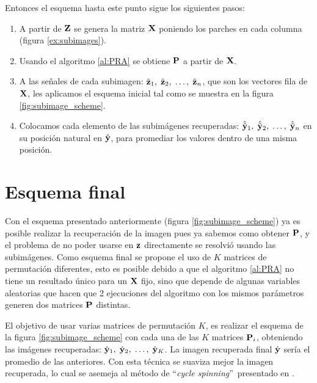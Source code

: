 Entonces el esquema hasta este punto sigue los siguientes pasos:

\begin{enumerate}
	\item A partir de $\Z$ se genera la matriz $\X$ poniendo los parches en cada columna (figura \ref{ex:subimages}).
	\item Usando el algoritmo \ref{al:PRA} se obtiene $\P$ a partir de $\X$.
	\item A las señales de cada subimagen: $\ztilde_1,\; \ztilde_2,\; \dots,\; \ztilde_n$, que son los vectores fila de $\X$, les aplicamos el esquema inicial tal como se muestra en la figura \ref{fig:subimage_scheme}.
	\item Colocamos cada elemento de las subim\'agenes recuperadas: $\yhattilde_1,\; \yhattilde_2,\; \dots,\; \yhattilde_n$ en su posici\'on natural en $\yhat$, para promediar los valores dentro de una misma posici\'on.
\end{enumerate}

\section{Esquema final}

Con el esquema presentado anteriormente (figura \ref{fig:subimage_scheme}) ya es posible realizar la recuperaci\'on de la imagen pues ya sabemos como obtener $\P$, y el problema de no poder usarse en $\z$ directamente se resolvi\'o usando las subim\'agenes. Como esquema final se propone el uso de $K$ matrices de permutaci\'on diferentes, esto es posible debido a que el algoritmo \ref{al:PRA} no tiene un resultado \'unico para un $\X$ fijo, sino que depende de algunas variables aleatorias que hacen que 2 ejecuciones del algoritmo con los mismos par\'ametros generen dos matrices $\P$ distintas.

El objetivo de usar varias matrices de permutaci\'on $K$, es realizar el esquema de la figura \ref{fig:subimage_scheme} con cada una de las $K$ matrices $\P_i$, obteniendo las im\'agenes recuperadas: $\yhat_1,\; \yhat_2,\; \dots,\; \yhat_K$. La imagen recuperada final $\yhat$ ser\'ia el promedio de las anteriores. Con esta t\'ecnica se suaviza mejor la imagen recuperada, lo cual se asemeja al método de \textquotedblleft\textit{cycle spinning}\textquotedblright\, presentado en \cite{coifman1995translation}.

